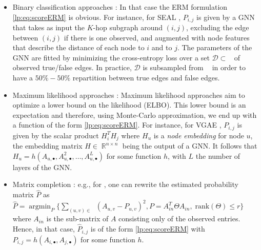 \documentclass[a4paper, 11pt]{article}
\theoremstyle{remark}
\DeclareMathOperator{\argmin}{argmin}
\DeclareMathOperator{\R}{\mathbb{R}}
\DeclareMathOperator{\Dtr}{\cD_{\text{train}}}
\newcommand{\EM}{\ensuremath}
\newcommand{\cD}{\EM{\mathcal{D}}}
\begin{document}
	\begin{itemize}
		\item Binary classification approaches \citep{zhang2018link, bleakley07}: In that case the ERM formulation \eqref{lp:eq:scoreERM} is obvious. For instance, for SEAL \citep{zhang2018link}, $P_{i,j}$  is given by a GNN that takes as input the $K$-hop subgraph around $(i,j)$, excluding the edge between $(i,j)$ if there is one observed, and augmented with node features that describe the distance of each node to $i$ and to $j$. The parameters of the GNN are fitted by minimizing the cross-entropy loss over a set $\cD \subset \Dtr$ of observed true/false edges. In practice, $\cD$ is subsampled from $\Dtr$ in order to have a $50\%-50\%$ repartition between true edges and false edges. %
				
	\item Maximum likelihood approaches \citep{kipf2016variational, chiquet20}: Maximum likelihood approaches aim to optimize a lower bound on the likelihood (ELBO). This lower bound is an expectation and therefore, using Monte-Carlo approximation, we end up with a function of the form \eqref{lp:eq:scoreERM}. For instance, for VGAE \citep{kipf2016variational}, $P_{i,j}$ is given by the scalar product $H_i^T H_j$ where $H_u$ is a \textit{node embedding} for node $u$, the embedding matrix $H \in \R^{n \times n}$ being the output of a GNN. It follows that $H_u = h(A_{u, \bullet},  A^2_{u, \bullet}, \dots, A^L_{u, \bullet})$ for some function $h$, with $L$ the number of layers of the GNN. 

	\item Matrix completion \citep{levina23, gaucher21}: e.g., for \cite{levina23}, one can rewrite the estimated probability matrix $\hat P$ as $\hat P =  \argmin_{P} \{ \sum_{(u,v) \in \Dtr} (A_{u,v} - P_{u,v})^2, P = A_{in}^T\Theta A_{in}, \; \text{rank}(\Theta) \leq r\}$ where $A_{in}$ is the sub-matrix of $A$ consisting only of the observed entries. Hence, in that case, $\hat P_{i,j}$ is of the form \eqref{lp:eq:scoreERM} with $P_{i,j}=h(A_{i, \bullet}, A_{j, \bullet})$ for some function $h$. 
	\end{itemize}
\end{document}
